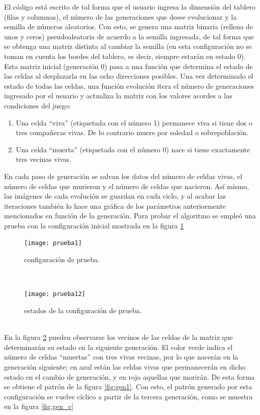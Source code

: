\documentclass[11pt]{diazessay} %
\begin{document}
El código está escrito de tal forma que el usuario ingresa la dimensión del tablero (filas y columnas), el número de las generaciones que desee evolucionar y la semilla de números aleatorios. Con esto, se genera una matriz binaria (rellena de unos y ceros) pseudoaleatoria de acuerdo a la semilla ingresada, de tal forma que se obtenga una matriz distinta al cambiar la semilla (en esta configuración no se toman en cuenta los bordes del tablero, es decir, siempre estarán en estado 0). Esta matriz inicial (generación 0) pasa a una función que determina el estado de las celdas al desplazarla en las ocho direcciones posibles. Una vez determinado el estado de todas las celdas, una función evolución itera el número de generaciones ingresado por el usuario y actualiza la matriz con los valores acordes a las condiciones del juego:
%
\begin{enumerate}
\item[1.] Una celda ``viva'' (etiquetada con el número 1) permanece viva si tiene dos o tres compañeras vivas. De lo contrario muere por soledad o sobrepoblación.
%
\item[2.] Una celda ``muerta'' (etiquetada con el número 0) nace si tiene exactamente tres vecinas vivas.
\end{enumerate}
%
En cada paso de generación se salvan los datos del número de celdas vivas, el número de celdas que murieron y el número de celdas que nacieron. Así mismo, las imágenes de cada evolución se guardan en cada ciclo, y al acabar las iteraciones también lo hace una gráfica de los parámetros anteriormente mencionados en función de la generación. Para probar el algoritmo se empleó una prueba con la configuración inicial mostrada en la figura \ref{fig:ini}
%
\begin{figure}[h!]
\centering
\texttt{[image: prueba1]}
\caption{configuración de prueba.} \label{fig:ini}
\end{figure}
\\
%
\begin{figure}[h!]
\centering
\texttt{[image: prueba12]}
\caption{estados de la configuración de prueba.}
\label{fig:est}
\end{figure}
\\
En la figura \ref{fig:est} pueden observarse los vecinos de las celdas de la matriz que determinarán su estado en la siguiente generación. El color verde indica el número de celdas ``muertas'' con tres vivas vecinas, por lo que nacerán en la generación siguiente; en azul están las celdas vivas que permanecerán en dicho estado en el cambio de generación, y en rojo aquellas que morirán. De esta forma se obtiene el patrón de la figura \ref{fig:gen1}. Con esto, el patrón generado por esta configuración se vuelve cíclico a partir de la tercera generación, como se muestra en la figura \ref{fig:gen_c}
\end{document}
